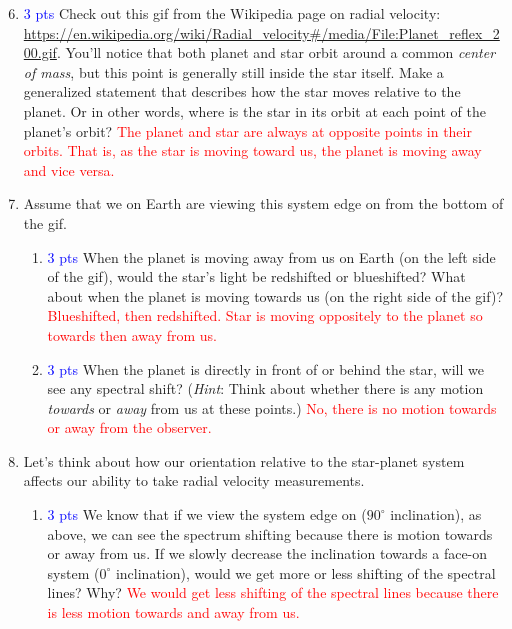 \documentclass[11pt]{article}
\begin{document}
\begin{enumerate}
\setcounter{enumi}{5}
    \item \textcolor{blue}{3 pts} Check out this gif from the Wikipedia page on radial velocity: \url{https://en.wikipedia.org/wiki/Radial_velocity#/media/File:Planet_reflex_200.gif}.  You'll notice that both planet and star orbit around a common \textit{center of mass}, but this point is generally still inside the star itself.  Make a generalized statement that describes how the star moves relative to the planet. Or in other words, where is the star in its orbit at each point of the planet's orbit?
    \textcolor{red}{The planet and star are always at opposite points in their orbits. That is, as the star is moving toward us, the planet is moving away and vice versa.}
        
    \item Assume that we on Earth are viewing this system edge on from the bottom of the gif.
        \begin{enumerate}
            \item \textcolor{blue}{3 pts} When the planet is moving away from us on Earth (on the left side of the gif), would the star's light be redshifted or blueshifted? What about when the planet is moving towards us (on the right side of the gif)? \textcolor{red}{Blueshifted, then redshifted.  Star is moving oppositely to the planet so towards then away from us.}
            
            \item \textcolor{blue}{3 pts} When the planet is directly in front of or behind the star, will we see any spectral shift? (\textit{Hint}: Think about whether there is any motion \textit{towards} or \textit{away} from us at these points.) \textcolor{red}{No, there is no motion towards or away from the observer.}
        \end{enumerate}
        
    \item Let's think about how our orientation relative to the star-planet system affects our ability to take radial velocity measurements.
        \begin{enumerate}
            \item \textcolor{blue}{3 pts} We know that if we view the system edge on ($90^\circ$ inclination), as above, we can see the spectrum shifting because there is motion towards or away from us.  If we slowly decrease the inclination towards a face-on system ($0^\circ$ inclination), would we get more or less shifting of the spectral lines? Why? \textcolor{red}{We would get less shifting of the spectral lines because there is less motion towards and away from us.}
            

\end{enumerate}
\end{enumerate}
\end{document}
